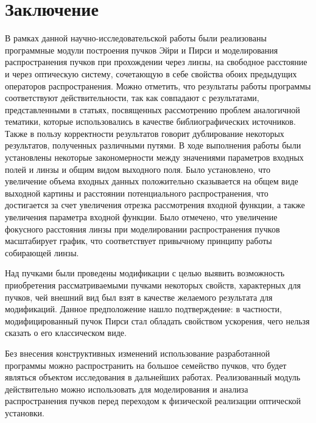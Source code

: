 \section*{Заключение}
{
	В рамках данной научно-исследовательской работы были реализованы
программные модули построения пучков Эйри и Пирси и моделирования
распространения пучков при прохождении через линзы, на свободное расстояние и через оптическую систему, сочетающую в себе свойства обоих предыдущих операторов распространения. Можно отметить, что
результаты работы программы соответствуют действительности, так как
совпадают с результатами, представленными в статьях, посвященных
рассмотрению проблем аналогичной тематики, которые использовались в
качестве библиографических источников. Также в пользу корректности результатов говорит дублирование некоторых результатов, полученных различными путями. В ходе выполнения работы были
установлены некоторые закономерности между значениями параметров
входных полей и линзы и общим видом выходного поля. Было установлено, что
увеличение объема входных данных положительно сказывается на общем виде
выходной картины и расстоянии потенциального распространения, что достигается за счет увеличения отрезка рассмотрения
входной функции, а также увеличения параметра входной функции. Было
отмечено, что увеличение фокусного расстояния линзы при моделировании
распространения пучков масштабирует график, что соответствует привычному принципу работы собирающей линзы.

	Над пучками были проведены модификации с целью выявить возможность приобретения рассматриваемыми пучками некоторых свойств, характерных для пучков, чей внешний вид был взят в качестве желаемого результата для модификаций. Данное предположение нашло подтверждение: в частности, модифицированный пучок Пирси стал обладать свойством ускорения, чего нельзя сказать о его классическом виде.

	Без внесения конструктивных изменений использование разработанной
программы можно распространить на большое семейство пучков, что будет
являться объектом исследования в дальнейших работах. Реализованный модуль
действительно можно использовать для моделирования и анализа
распространения пучков перед переходом к физической реализации оптической
установки.

\newpage
}



